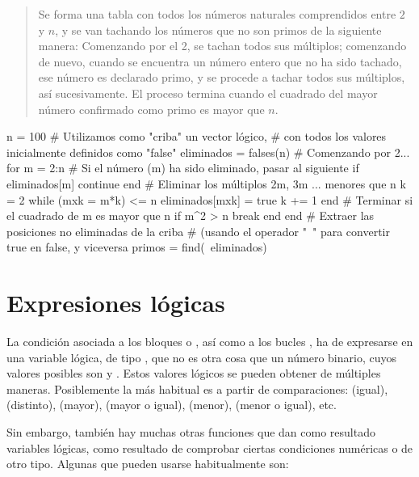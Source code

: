 \begin{quote}
Se forma una tabla con todos los números naturales comprendidos entre $2$ y $n$, y se van tachando los números que no son primos de la siguiente manera: Comenzando por el 2, se tachan todos sus múltiplos; comenzando de nuevo, cuando se encuentra un número entero que no ha sido tachado, ese número es declarado primo, y se procede a tachar todos sus múltiplos, así sucesivamente. El proceso termina cuando el cuadrado del mayor número confirmado como primo es mayor que $n$.
\end{quote}

\begin{juliacode}
n = 100
# Utilizamos como "criba" un vector lógico,
# con todos los valores inicialmente definidos como "false"
eliminados = falses(n)
# Comenzando por 2...
for m = 2:n
  # Si el número (m) ha sido eliminado, pasar al siguiente
  if eliminados[m]
    continue
  end
  # Eliminar los múltiplos 2m, 3m ... menores que n
  k = 2
  while (mxk = m*k) <= n
    eliminados[mxk] = true
    k += 1
  end
  # Terminar si el cuadrado de m es mayor que n 
  if m^2 > n
    break
  end
end
# Extraer las posiciones no eliminadas de la criba
# (usando el operador "~" para convertir true en false, y viceversa
primos = find(~eliminados)
\end{juliacode}

\section{Expresiones lógicas}

La condición asociada a los bloques  o , así como a los bucles , ha de expresarse en una variable lógica, de tipo , que no es otra cosa que un número binario, cuyos valores posibles son  y . Estos valores lógicos se pueden obtener de múltiples maneras. Posiblemente la más habitual es a partir de comparaciones:
\code{==} (igual), \code{!=} (distinto),
\code{>} (mayor), \code{>=} (mayor o igual),
\code{<} (menor), \code{<=} (menor o igual), etc.

Sin embargo, también hay muchas otras funciones que dan como resultado variables lógicas, como resultado de comprobar ciertas condiciones numéricas o de otro tipo. Algunas que pueden usarse habitualmente son:

